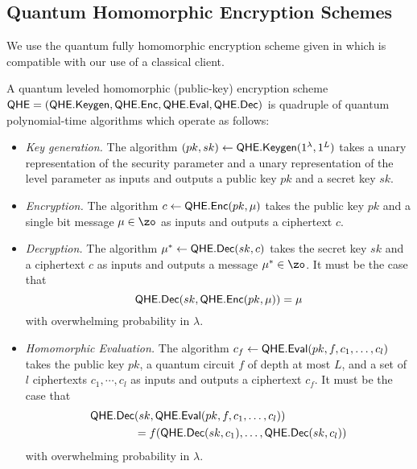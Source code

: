 

\subsection{Quantum Homomorphic Encryption Schemes}

We use the quantum fully homomorphic encryption scheme given in \cite{mahadev_qfhe} which is compatible with our use of a classical client.
\begin{definition}
    A quantum leveled homomorphic (public-key) encryption scheme $\mathsf{QHE}=(\mathsf{QHE.Keygen}, \mathsf{QHE.Enc}, \mathsf{QHE.Eval}, \mathsf{QHE.Dec})$ is quadruple of quantum polynomial-time algorithms which operate as follows:
    \begin{itemize}
        \item \emph{Key generation.}
            The algorithm $(pk, sk)\leftarrow\mathsf{QHE.Keygen}(1^\lambda, 1^L)$ takes a unary representation of the security parameter and a unary representation of the level parameter as inputs and outputs a public key $pk$ and a secret key $sk$.
        \item \emph{Encryption.}
            The algorithm $c\leftarrow\mathsf{QHE.Enc}(pk, \mu)$ takes the public key $pk$ and a single bit message $\mu\in\zo$ as inputs and outputs a ciphertext $c$.
        \item \emph{Decryption.}
            The algorithm $\mu^*\leftarrow\mathsf{QHE.Dec}(sk, c)$ takes the secret key $sk$ and a ciphertext $c$ as inputs and outputs a message $\mu^*\in\zo$.
            It must be the case that
                $$\mathsf{QHE.Dec}(sk, \mathsf{QHE.Enc}(pk, \mu))=\mu$$
            with overwhelming probability in $\lambda$.
        \item \emph{Homomorphic Evaluation.}
            The algorithm $c_f\leftarrow\mathsf{QHE.Eval}(pk, f, c_1, \ldots, c_l)$ takes the public key $pk$, a quantum circuit $f$ of depth at most $L$, and a set of $l$ ciphertexts $c_1,\cdots,c_l$ as inputs and outputs a ciphertext $c_f$.
            It must be the case that
            \begin{align*}
                \mathsf{QHE.Dec}&(sk, \mathsf{QHE.Eval}(pk, f, c_1, \ldots, c_l))
                \\
                &=f(\mathsf{QHE.Dec}(sk, c_1),\ldots,\mathsf{QHE.Dec}(sk, c_l))
            \end{align*}
            with overwhelming probability in $\lambda$.
    \end{itemize}
\end{definition}


